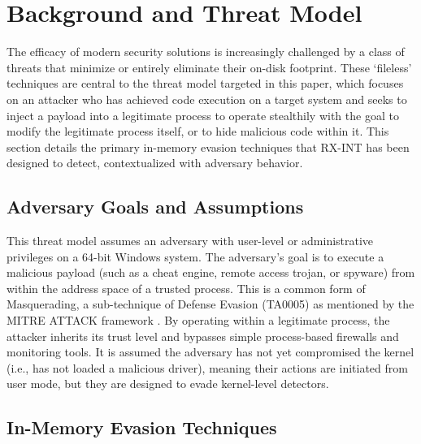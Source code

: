\documentclass[journal]{IEEEtran}
\begin{document}
\section{Background and Threat Model}
\label{sec:background}
The efficacy of modern security solutions is increasingly challenged by a class of threats that minimize or entirely eliminate their on-disk footprint. These `fileless' techniques are central to the threat model targeted in this paper, which focuses on an attacker who has achieved code execution on a target system and seeks to inject a payload into a legitimate process to operate stealthily with the goal to modify the legitimate process itself, or to hide malicious code within it. This section details the primary in-memory evasion techniques that RX-INT has been designed to detect, contextualized with adversary behavior.
\subsection{Adversary Goals and Assumptions}
This threat model assumes an adversary with user-level or administrative privileges on a 64-bit Windows system. The adversary's goal is to execute a malicious payload (such as a cheat engine, remote access trojan, or spyware) from within the address space of a trusted process. This is a common form of Masquerading, a sub-technique of Defense Evasion (TA0005) as mentioned by the MITRE ATTACK framework \cite{MITRE_ATTACK_DEFENSE_EVASION}. By operating within a legitimate process, the attacker inherits its trust level and bypasses simple process-based firewalls and monitoring tools. It is assumed the adversary has not yet compromised the kernel (i.e., has not loaded a malicious driver), meaning their actions are initiated from user mode, but they are designed to evade kernel-level detectors.
\subsection{In-Memory Evasion Techniques}
\end{document}
